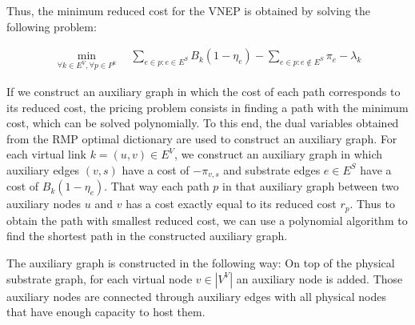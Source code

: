 \documentclass[conference]{IEEEtran}
\begin{document}
Thus, the minimum reduced cost for the VNEP is obtained by solving the following problem:

\begin{align}
  \min_{ \forall k \in E^{V}, \forall p \in P^{k}}  \quad  \sum\limits_{e \in p : e \in E^S} B_{k} (1 - \eta_{e}) - \sum\limits_{e \in p : e \notin E^S} \pi_{e}-\lambda_{k} \nonumber
\end{align}

If we construct an auxiliary graph in which the cost of each path corresponds to its reduced cost, 
the pricing problem consists in finding a path with the minimum cost, which can be solved polynomially.
To this end, the dual variables obtained from the RMP optimal dictionary are used to construct an auxiliary graph.
For each virtual link $k = (u,v) \in E^V$, we construct an auxiliary graph in which auxiliary edges $(v,s)$ have a cost of $-\pi_{v,s}$ and substrate edges $e \in E^S$ have a cost of $B_{k}(1 - \eta_{e})$. 
That way each path $p$ in that auxiliary graph between two auxiliary nodes $u$ and $v$ has a cost exactly equal to its reduced cost $r_p$.
Thus to obtain the path with smallest reduced cost, we can use a polynomial algorithm to find the shortest path in the constructed auxiliary graph.

The auxiliary graph is constructed in the following way:
On top of the physical substrate graph, for each virtual node $v \in |V^V|$ an auxiliary node is added.
Those auxiliary nodes are connected through auxiliary edges with all physical nodes that have enough capacity to host them.
\end{document}
